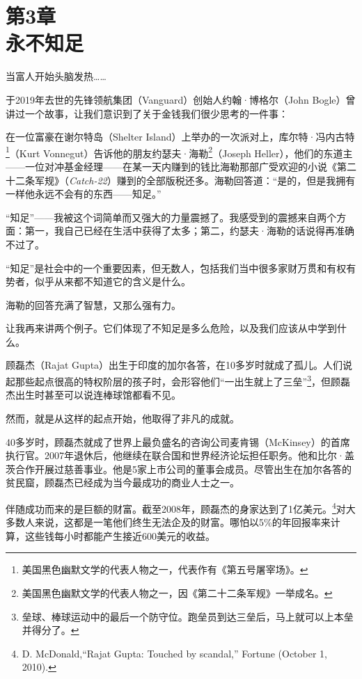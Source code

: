 
\section[第3章\q 永不知足]{第3章\\ 永不知足}

{\kaishu

当富人开始头脑发热……

}

于2019年去世的先锋领航集团（Vanguard）创始人约翰·博格尔（John Bogle）曾讲过一个故事，让我们意识到了关于金钱我们很少思考的一件事：

{\kaishu

在一位富豪在谢尔特岛（Shelter Island）上举办的一次派对上，库尔特·冯内古特\footnote{美国黑色幽默文学的代表人物之一，代表作有《第五号屠宰场》。}（Kurt Vonnegut）告诉他的朋友约瑟夫·海勒\footnote{美国黑色幽默文学的代表人物之一，因《第二十二条军规》一举成名。}（Joseph Heller），他们的东道主——一位对冲基金经理——在某一天内赚到的钱比海勒那部广受欢迎的小说《第二十二条军规》（\textit{Catch-22}）赚到的全部版税还多。海勒回答道：“是的，但是我拥有一样他永远不会有的东西——知足。”

“知足”——我被这个词简单而又强大的力量震撼了。我感受到的震撼来自两个方面：第一，我自己已经在生活中获得了太多；第二，约瑟夫·海勒的话说得再准确不过了。

“知足”是社会中的一个重要因素，但无数人，包括我们当中很多家财万贯和有权有势者，似乎从来都不知道它的含义是什么。

}

海勒的回答充满了智慧，又那么强有力。

让我再来讲两个例子。它们体现了不知足是多么危险，以及我们应该从中学到什么。

顾磊杰（Rajat Gupta）出生于印度的加尔各答，在10多岁时就成了孤儿。人们说起那些起点很高的特权阶层的孩子时，会形容他们“一出生就上了三垒”\footnote{垒球、棒球运动中的最后一个防守位。跑垒员到达三垒后，马上就可以上本垒并得分了。}，但顾磊杰出生时甚至可以说连棒球馆都看不见。

然而，就是从这样的起点开始，他取得了非凡的成就。

40多岁时，顾磊杰就成了世界上最负盛名的咨询公司麦肯锡（McKinsey）的首席执行官。2007年退休后，他继续在联合国和世界经济论坛担任职务。他和比尔·盖茨合作开展过慈善事业。他是5家上市公司的董事会成员。尽管出生在加尔各答的贫民窟，顾磊杰已经成为当今最成功的商业人士之一。

伴随成功而来的是巨额的财富。截至2008年，顾磊杰的身家达到了1亿美元。\footnote{D. McDonald,“Rajat Gupta: Touched by scandal,” Fortune (October 1, 2010).}对大多数人来说，这都是一笔他们终生无法企及的财富。哪怕以5\%的年回报率来计算，这些钱每小时都能产生接近600美元的收益。

